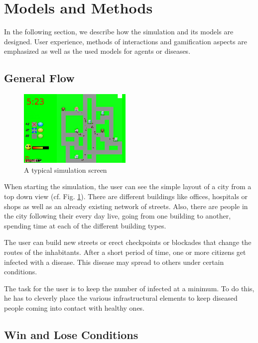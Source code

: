 \documentclass[table]{sig-alternate-05-2015}
\begin{document}
\section{Models and Methods}

In the following section, we describe how the simulation and its models are designed. User experience, methods of interactions and gamification aspects are emphasized as well as the used models for agents or diseases.

\subsection{General Flow}

\begin{figure}[h]
\includegraphics[width = 0.48\textwidth]{Pictures/screen.png}
\caption{A typical simulation screen}
\label{pic:screen}
\end{figure}

When starting the simulation, the user can see the simple layout of a city from a top down view (cf. Fig. \ref{pic:screen}). There are different buildings like offices, hospitals or shops as well as an already existing network of streets. Also, there are people in the city following their every day live, going from one building to another, spending time at each of the different building types.

The user can build new streets or erect checkpoints or blockades that change the routes of the inhabitants. After a short period of time, one or more citizens get infected with a disease. This disease may spread to others under certain conditions.

The task for the user is to keep the number of infected at a minimum. To do this, he has to cleverly place the various infrastructural elements to keep diseased people coming into contact with healthy ones.


\subsection{Win and Lose Conditions}
\end{document}
